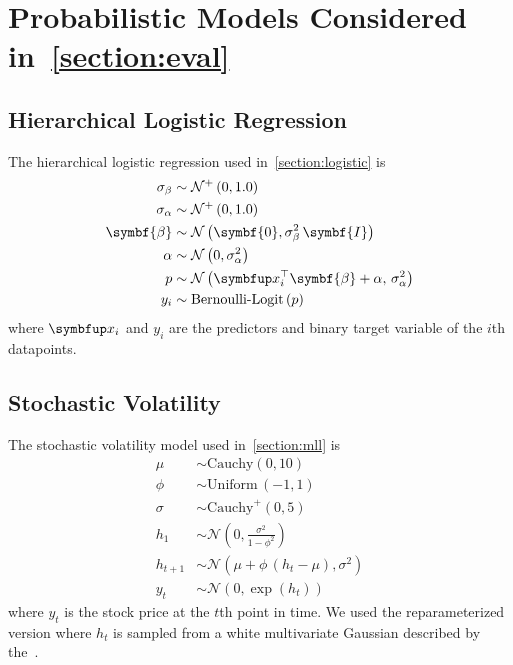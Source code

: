 
\section{Probabilistic Models Considered in~\cref{section:eval}}
\subsection{Hierarchical Logistic Regression}
The hierarchical logistic regression used in~\cref{section:logistic} is 
\begin{align*}
    \sigma_{\beta}  &\sim \mathcal{N}^+\left(0, 1.0\right) \\
    \sigma_{\alpha} &\sim \mathcal{N}^+\left(0, 1.0\right) \\
    \symbf{\beta} &\sim \mathcal{N}\left(\symbf{0}, \sigma_{\beta}^2\,\symbf{I}\right) \\
    \alpha        &\sim \mathcal{N}\left(0, \sigma_{\alpha}^2\right) \\
    p             &\sim \mathcal{N}\left(\vx_i^{\top}\symbf{\beta} + \alpha,\, \sigma_{\alpha}^2\right)\\
    y_i           &\sim \text{Bernoulli-Logit}\,(p)
\end{align*}
where \(\vx_i\) and \(y_i\) are the predictors and binary target variable of the \(i\)th datapoints.

\subsection{Stochastic Volatility}
The stochastic volatility model used in~\cref{section:mll} is
\begin{align*}
    \mu    &\sim \mathrm{Cauchy}(0, 10) \\
    \phi   &\sim \mathrm{Uniform}\,(-1, 1) \\
    \sigma &\sim \mathrm{Cauchy}^+(0, 5) \\
    h_1    &\sim \mathcal{N}\left( 0, \frac{\sigma^2}{1 - \phi^2} \right) \\
    h_{t+1} &\sim \mathcal{N}\left( \mu + \phi\,\left( h_{t} - \mu \right), \sigma^2 \right) \\
    y_t    &\sim \mathcal{N}\left( 0, \exp\left( h_{t} \right) \right)
\end{align*}
where \(y_t\) is the stock price at the \(t\)th point in time.
We used the reparameterized version where \(h_{t}\) is sampled from a white multivariate Gaussian described by the~\citet{stan2020}.

